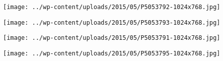  \newline
\centerline{\texttt{[image: ../wp-content/uploads/2015/05/P5053792-1024x768.jpg]} } 
 \newline
 \newline
\centerline{\texttt{[image: ../wp-content/uploads/2015/05/P5053793-1024x768.jpg]} } 
 \newline
 \newline
\centerline{\texttt{[image: ../wp-content/uploads/2015/05/P5053791-1024x768.jpg]} } 
 \newline
 \newline
\centerline{\texttt{[image: ../wp-content/uploads/2015/05/P5053795-1024x768.jpg]} } 
 \newline

\newpage
 
